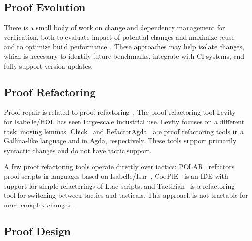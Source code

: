 \subsection*{Proof Evolution}


There is a small body of work on change and dependency management for verification,
both to evaluate impact of potential changes and maximize reuse~\cite{873647, Autexier:2010:CMH:1986659.1986663}
and to optimize build performance~\cite{Celik:2017:IRP:3155562.3155588}.
These approaches may help isolate changes, which is necessary to identify future benchmarks, integrate
with CI systems, and fully support version updates.

\subsection*{Proof Refactoring}


Proof repair is related to proof refactoring~\cite{WhitesidePhD}. 
The proof refactoring tool Levity~\cite{Bourke12} for Isabelle/HOL has seen large-scale industrial use.
Levity focuses on a different task: moving lemmas.
Chick~\cite{robert2018} and RefactorAgda~\cite{wibergh2019} are proof refactoring tools
in a Gallina-like language and in Agda, respectively.
These tools support primarily syntactic changes and do not have tactic support.

A few proof refactoring tools operate directly over tactics:
POLAR~\cite{Dietrich2013} refactors proof scripts in languages based on Isabelle/Isar~\cite{Wenzel2007isar},
CoqPIE~\cite{Roe2016} is an IDE with support for simple refactorings of Ltac scripts, and
Tactician~\cite{adams2015} is a refactoring tool for switching between tactics and tacticals.
This approach is not tractable for more complex changes~\cite{robert2018}.

\subsection*{Proof Design}


